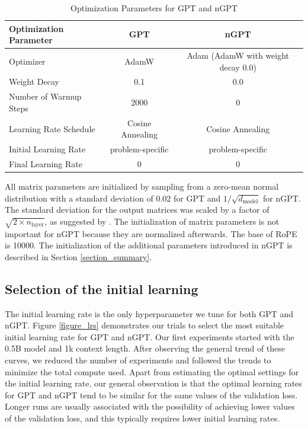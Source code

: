 \documentclass{article} %
\begin{document}
\begin{table}[t]
\centering
\caption{Optimization Parameters for GPT and nGPT}
\begin{tabular}{ l c c }
\toprule
\textbf{Optimization Parameter}       & \textbf{GPT}                    & \textbf{nGPT}                    \\ 
\midrule
Optimizer                             & AdamW                            & Adam (AdamW with weight decay 0.0) \\ 
Weight Decay                          & 0.1                              & 0.0                               \\ 
Number of Warmup Steps                & 2000                             & 0                                 \\ 
Learning Rate Schedule                & Cosine Annealing                 & Cosine Annealing                  \\ 
Initial Learning Rate                   & problem-specific                                & problem-specific    \\
Final Learning Rate                   & 0                                & 0                                 \\ 
\bottomrule
\end{tabular}
\label{table_optimization_params}
\end{table}

All matrix parameters are initialized by sampling from a zero-mean normal distribution with a standard deviation of $0.02$ for GPT and $1/\sqrt{d_{\text{model}}}$ for nGPT. The standard deviation for the output matrices was scaled by a factor of $\sqrt{2 \times n_{\text{layer}}}$, as suggested by \cite{radford2019language}. The initialization of matrix parameters is not important for nGPT because they are normalized afterwards. The base of RoPE is 10000. The initialization of the additional parameters introduced in nGPT is  described in Section \ref{section_summary}.

\subsection{Selection of the initial learning}
\label{appendix:init_learning}

The initial learning rate is the only hyperparameter we tune for both GPT and nGPT. Figure \ref{figure_lrs} demonstrates our trials to select the most suitable initial learning rate for GPT and nGPT. Our first experiments started with the 0.5B model and  1k context length. After observing the general trend of these curves, we reduced the number of experiments and followed the trends to minimize the total compute used. Apart from estimating the optimal settings for the initial learning rate, our general observation is that the optimal learning rates for GPT and nGPT tend to be similar for the same values of the validation loss. Longer runs are usually associated with the possibility of achieving lower values of the validation loss, and this typically requires lower initial learning rates.
\end{document}
